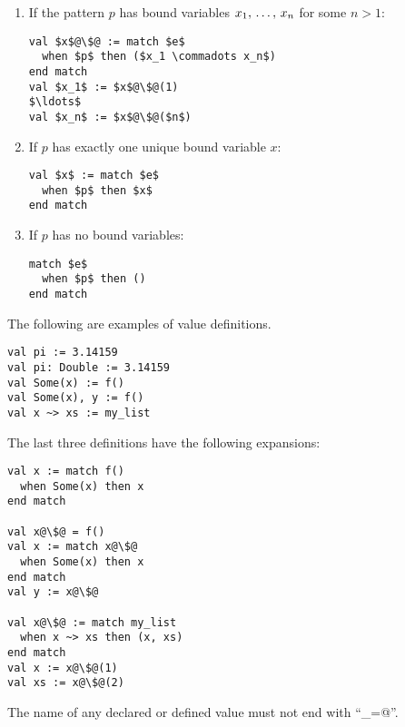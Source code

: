 \begin{enumerate}
\item
If the pattern $p$ has bound variables $x_1 ,\, \ldots ,\, x_n$ for some $n > 1$:
\begin{lstlisting}[escapechar=@]
val $x$@\$@ := match $e$
  when $p$ then ($x_1 \commadots x_n$)
end match
val $x_1$ := $x$@\$@(1)
$\ldots$
val $x_n$ := $x$@\$@($n$)
\end{lstlisting}

\item
If $p$ has exactly one unique bound variable $x$:
\begin{lstlisting}
val $x$ := match $e$
  when $p$ then $x$
end match
\end{lstlisting}

\item
If $p$ has no bound variables:
\begin{lstlisting}
match $e$
  when $p$ then ()
end match
\end{lstlisting}
\end{enumerate}

\example The following are examples of value definitions. 
\begin{lstlisting}
val pi := 3.14159
val pi: Double := 3.14159
val Some(x) := f() 
val Some(x), y := f()
val x ~> xs := my_list
\end{lstlisting}

The last three definitions have the following expansions:
\begin{lstlisting}[escapechar=@]
val x := match f()
  when Some(x) then x
end match

val x@\$@ = f()
val x := match x@\$@
  when Some(x) then x
end match
val y := x@\$@

val x@\$@ := match my_list
  when x ~> xs then (x, xs)
end match
val x := x@\$@(1)
val xs := x@\$@(2)
\end{lstlisting}

The name of any declared or defined value must not end with ``\lstinline@_=@''. 

